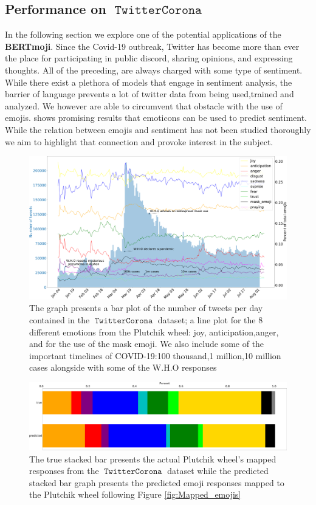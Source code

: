 \documentclass[11pt]{article}
\DeclareMathOperator{\corona}{\texttt{TwitterCorona}}
\begin{document}
\subsection{Performance on $\corona$}
In the following section we explore one of the potential applications of the \textbf{BERTmoji}.
Since the Covid-19 outbreak, Twitter has become more than ever the place for participating in public discord, 
sharing opinions, and expressing thoughts. All of the preceding, are always charged with some type of sentiment.
While there exist a plethora of models that engage in sentiment analysis, the barrier of language prevents a lot 
of twitter data from being used,trained and analyzed. We however are able to circumvent that obstacle with the use of emojis.
\cite{CAN_EMOTICONS_BE_USED_TO_PREDICT_SENTIMENT} shows promising results that emoticons can be used to predict sentiment. 
While the relation between emojis and sentiment has not been studied thoroughly we aim to highlight that connection and 
provoke interest in the subject.

\begin{figure}[!ht]
    \centering
    \includegraphics[width=\textwidth]{images/corona_dataset_graph.pdf}
    \caption{The graph presents a bar plot of the number of tweets per day contained in the $\corona$ dataset;
    a line plot for the 8 different emotions from the Plutchik wheel: joy, anticipation,anger, and for the use of the mask emoji.
    We also include some of the important timelines of COVID-19:100 thousand,1 million,10 million cases alongside with some of the W.H.O responses}
    \label{fig:tweets_per_day_sent}
\end{figure}

\begin{figure}[!ht]
    \centering
    \includegraphics[width=\textwidth]{images/true_pred_rotated.pdf}
    \caption{The true stacked bar presents the actual Plutchik wheel's mapped responses from the $\corona$ dataset while the predicted stacked bar graph presents the predicted emoji responses mapped to the Plutchik wheel following Figure  \ref{fig:Mapped_emojis} }
    \label{fig:actual vs pred}
\end{figure}
\end{document}
